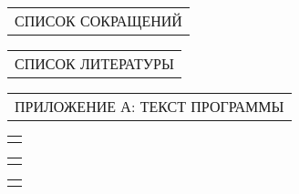 \documentclass[12pt, А4, twoside]{article}
\begin{document}
\begin{FlushLeft}
		\vspace{-0.1 cm}
		
		\begin{tabular}{p{17.25cm}}
			\hspace{0.3cm} \textsf{СПИСОК СОКРАЩЕНИЙ} \vspace{0pt} \hline \\
		\end{tabular}
		
		\vspace{-0.1 cm}
		
		\begin{tabular}{p{17.25cm}}
			\hspace{0.3cm} \textsf{СПИСОК ЛИТЕРАТУРЫ} \vspace{0pt} \hline \\
		\end{tabular}
		
		\vspace{-0.1 cm}
		
		\begin{tabular}{p{17.25cm}}
			\hspace{0.3cm} \textsf{ПРИЛОЖЕНИЕ А: ТЕКСТ ПРОГРАММЫ} \vspace{0pt} \hline  \\
		\end{tabular}
		
		
		\begin{tabular}{p{17.25cm}}
			\vspace{0pt} \hline \\
		\end{tabular}
		
		\begin{tabular}{p{17.25cm}}
			\vspace{0pt} \hline \\
		\end{tabular}
		
		\begin{tabular}{p{17.25cm}}
			\vspace{0pt} \hline \\
		\end{tabular}
		
%		
		

\end{FlushLeft}
\end{document}

